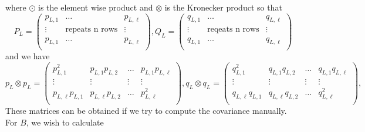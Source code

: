 \documentclass{statsmsc}
\begin{document}
where $\odot$ is the element wise product and $\otimes$ is the Kronecker product so that 
$$
P_L=\begin{pmatrix}
  p_{L,1}  & \dots & p_{L,\ell}  \\
  \vdots & \text{repeats n rows} &  \vdots\\
  p_{L,1}  & \dots & p_{L,\ell}  \\
\end{pmatrix},
Q_L=\begin{pmatrix}
  q_{L,1}  & \dots & q_{L,\ell}  \\
  \vdots & \text{reqeats n rows} &  \vdots\\
  q_{L,1}  & \dots & q_{L,\ell}  \\
\end{pmatrix}
$$
and we have 
$$
p_L\otimes p_L=\begin{pmatrix}
  p_{L,1}^2 & p_{L,1}p_{L,2} & \dots & p_{L,1}p_{L,\ell} \\
  \vdots & \vdots & \vdots & \vdots \\
  p_{L,\ell}p_{L,1} & p_{L,\ell}p_{L,2} & \dots & p_{L,\ell}^2 \\
\end{pmatrix},
q_L\otimes q_L=\begin{pmatrix}
  q_{L,1}^2 & q_{L,1}q_{L,2} & \dots & q_{L,1}q_{L,\ell} \\
  \vdots & \vdots & \vdots & \vdots \\
  q_{L,\ell}q_{L,1} & q_{L,\ell}q_{L,2} & \dots & q_{L,\ell}^2 \\
\end{pmatrix},
$$ 
These matrices can be obtained if we try to compute the covariance manually. 
For $B$, we wish to calculate 
\end{document}

